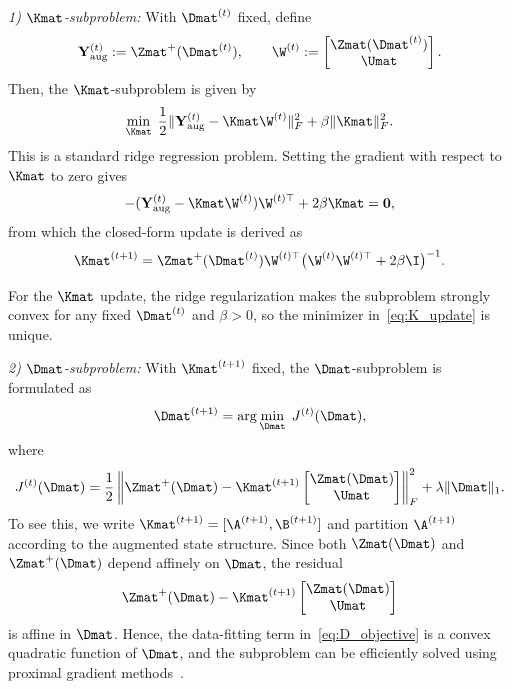 \textit{1) $\Kmat$-subproblem:}
With $\Dmat^{(t)}$ fixed, define
\[
\mathbf{Y}_{\mathrm{aug}}^{(t)} := \Zmat^+(\Dmat^{(t)}), \qquad
\W^{(t)} :=
\begin{bmatrix}
\Zmat(\Dmat^{(t)}) \\ \Umat
\end{bmatrix}.
\]
Then, the $\Kmat$-subproblem is given by
\[
\min_{\Kmat} \; 
\frac{1}{2}\|\mathbf{Y}_{\mathrm{aug}}^{(t)}
- \Kmat \W^{(t)}\|_F^2
+ \beta\|\Kmat\|_F^2 .
\]
This is a standard ridge regression problem. Setting the gradient with respect to $\Kmat$ to zero gives
\[
-(\mathbf{Y}_{\mathrm{aug}}^{(t)} - \Kmat \W^{(t)})
\W^{(t)\top} + 2\beta\Kmat = \mathbf{0},
\]
from which the closed-form update is derived as
\begin{equation}
\label{eq:K_update}
\Kmat^{(t+1)}
= \Zmat^+(\Dmat^{(t)}) \W^{(t)\top}
\bigl( \W^{(t)} \W^{(t)\top} + 2\beta \I \bigr)^{-1}.
\end{equation}

For the $\Kmat$ update, the ridge regularization makes the subproblem strongly convex for any fixed $\Dmat^{(t)}$ and $\beta>0$, so the minimizer in~\eqref{eq:K_update} is unique.

\textit{2) $\Dmat$-subproblem:} With $\Kmat^{(t+1)}$ fixed, the $\Dmat$-subproblem is formulated as
\begin{equation}
\label{eq:D_subproblem}
\Dmat^{(t+1)} = \arg\min_{\Dmat} \; J^{(t)}(\Dmat),
\end{equation}
where
\begin{equation}
\label{eq:D_objective}
J^{(t)}(\Dmat) = \frac{1}{2}\left\| \Zmat^+(\Dmat) - \Kmat^{(t+1)}
\begin{bmatrix}
\Zmat(\Dmat) \\ \Umat
\end{bmatrix} \right\|_F^2
+ \lambda\|\Dmat\|_1.
\end{equation}
To see this, we write $\Kmat^{(t+1)} = [\A^{(t+1)},\B^{(t+1)}]$ and partition $\A^{(t+1)}$ according to the augmented state structure. Since both $\Zmat(\Dmat)$ and $\Zmat^+(\Dmat)$ depend affinely on $\Dmat$, the residual
\[
\Zmat^+(\Dmat) - \Kmat^{(t+1)}
\begin{bmatrix}
\Zmat(\Dmat) \\ \Umat
\end{bmatrix}
\]
is affine in $\Dmat$. Hence, the data-fitting term in~\eqref{eq:D_objective} is a convex quadratic function of $\Dmat$, and the subproblem can be efficiently solved using proximal gradient methods~\cite{Beck2009ISTA}.

